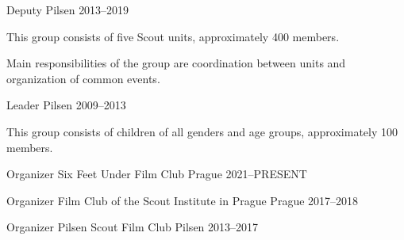 \begin{cventries}
\cventry
{Deputy} %
{} %
{Pilsen} %
{2013--2019} %
{
  \begin{cvitems} %
    \item {This group consists of five Scout units, approximately 400 members.} 
    \item {Main responsibilities of the group are coordination between units and organization of common events.}
  \end{cvitems}
}

\cventry
{Leader} %
{} %
{Pilsen} %
{2009--2013} %
{
  \begin{cvitems} %
    \item {This group consists of children of all genders and age groups, approximately 100 members.} 
  \end{cvitems}
}


\end{cventries}




\begin{cventries}
  \cventry
    {Organizer} %
    {Six Feet Under Film Club} %
    {Prague} %
    {2021--PRESENT} %
    {}

  \cventry
    {Organizer} %
    {Film Club of the Scout Institute in Prague} %
    {Prague} %
    {2017--2018} %
    {}

  \cventry
    {Organizer} %
    {Pilsen Scout Film Club} %
    {Pilsen} %
    {2013--2017} %
    {}


\end{cventries}

